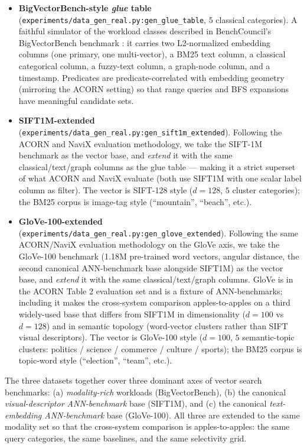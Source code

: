 \documentclass[sigconf,nonacm,review]{acmart}
\theoremstyle{plain}
\theoremstyle{definition}
\theoremstyle{remark}
\begin{document}
\begin{itemize}[leftmargin=*, itemsep=1pt]
  \item \textbf{BigVectorBench-style \emph{glue} table}
    (\texttt{experiments/data\_gen\_real.py:gen\_glue\_table},
    $5$ classical categories).  A faithful simulator of the
    workload classes described in BenchCouncil's BigVectorBench
    benchmark \cite{bigvectorbench2025}: it carries two
    L2-normalized embedding columns (one primary, one
    multi-vector), a BM25 text column, a classical categorical
    column, a fuzzy-text column, a graph-node column, and a
    timestamp.  Predicates are predicate-correlated with
    embedding geometry (mirroring the ACORN setting) so that
    range queries and BFS expansions have meaningful candidate
    sets.
  \item \textbf{SIFT1M-extended} (\texttt{experiments/data\_gen\_real.py:gen\_sift1m\_extended}).
    Following the ACORN and NaviX evaluation methodology, we
    take the SIFT-1M benchmark \cite{lowe2004sift} as the
    vector base, and \emph{extend} it with the same
    classical/text/graph columns as the glue table --- making
    it a strict superset of what ACORN and NaviX evaluate
    (both use SIFT1M with one scalar label column as filter).
    The vector is SIFT-128 style ($d = 128$, $5$ cluster
    categories); the BM25 corpus is image-tag style
    (``mountain'', ``beach'', etc.).
  \item \textbf{GloVe-100-extended}
    (\texttt{experiments/data\_gen\_real.py:gen\_glove\_extended}).
    Following the same ACORN/NaviX evaluation methodology on
    the GloVe axis, we take the GloVe-100 benchmark
    \cite{pennington2014glove} (1.18M pre-trained word vectors,
    angular distance, the second canonical ANN-benchmark base
    alongside SIFT1M) as the vector base, and \emph{extend} it
    with the same classical/text/graph columns.  GloVe is in
    the ACORN Table 2 evaluation set and is a fixture of
    ANN-benchmarks; including it makes the cross-system
    comparison apples-to-apples on a third widely-used base
    that differs from SIFT1M in dimensionality ($d = 100$ vs
    $d = 128$) and in semantic topology (word-vector clusters
    rather than SIFT visual descriptors).  The vector is
    GloVe-100 style ($d = 100$, $5$ semantic-topic clusters:
    politics / science / commerce / culture / sports); the
    BM25 corpus is topic-word style (``election'', ``team'',
    etc.).
\end{itemize}

\noindent The three datasets together cover three dominant
axes of vector search benchmarks: (a) \emph{modality-rich}
workloads (BigVectorBench), (b) the canonical
\emph{visual-descriptor ANN-benchmark} base (SIFT1M), and
(c) the canonical \emph{text-embedding ANN-benchmark} base
(GloVe-100).  All three are extended to the same modality
set so that the cross-system comparison is apples-to-apples:
the same query categories, the same baselines, and the same
selectivity grid.
\end{document}
